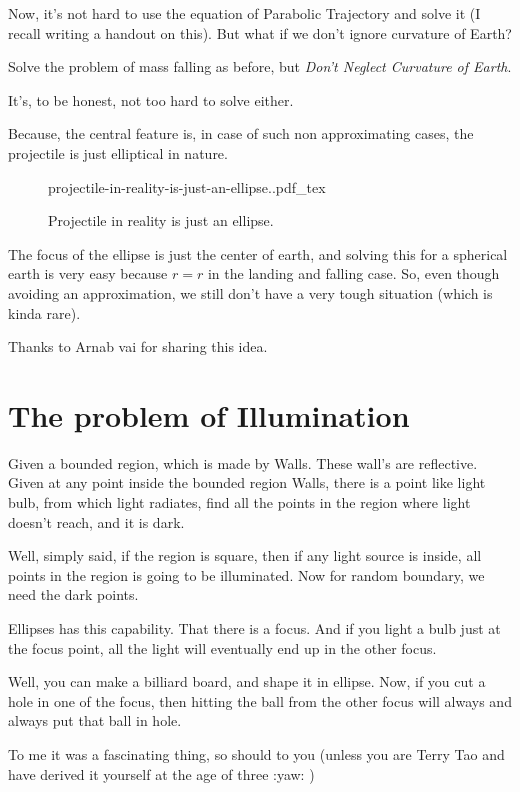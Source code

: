 \documentclass[12pt,a4paper]{article}
\newcommand{\incfig}[1]{%
    \def\svgwidth{0.7\columnwidth}
    {#1.pdf_tex}
}
\newcommand{ \pk }[1]{\begin{problem} #1 \end{problem} }
\begin{document}
Now, it's not hard to use the equation of Parabolic Trajectory and solve it (I recall writing a handout on this). But what if we don't ignore curvature of Earth?

\pk{ Solve the problem of mass falling as before, but \emph{Don't Neglect Curvature of Earth}.  }

It's, to be honest, not too hard to solve either.

Because, the central feature is, in case of such non approximating cases, the projectile is just elliptical in nature. 

\begin{figure}[ht!]
    \centering
    \incfig{projectile-in-reality-is-just-an-ellipse.}
    \caption{Projectile in reality is just an ellipse.}
    \label{fig:projectile-in-reality-is-just-an-ellipse.}
\end{figure}


The focus of the ellipse is just the center of earth, and solving this for a spherical earth is very easy because $r=r$ in the landing and falling case. So, even though avoiding an approximation, we still don't have a very tough situation (which is kinda rare).

Thanks to Arnab vai for sharing this idea. 


\section{ The problem of Illumination }
\pk{ Given a bounded region, which is made by Walls. These wall's are reflective. Given at any point inside the bounded region Walls, there is a point like light bulb, from which light radiates, find all the points in the region where light doesn't reach, and it is dark. }

Well, simply said, if the region is square, then if any light source is inside, all points in the region is going to be illuminated. Now for random boundary, we need the dark points. 

Ellipses has this capability. That there is a focus. And if you light a bulb just at the focus point, all the light will eventually end up in the other focus. 

Well, you can make a billiard board, and shape it in ellipse. Now, if you cut a hole in one of the focus, then hitting the ball from the other focus will always and always put that ball in hole.

To me it was a fascinating thing, so should to you (unless you are Terry Tao and have derived it yourself at the age of three :yaw: ) 
\end{document}
